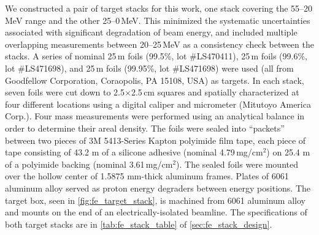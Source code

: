 We constructed a pair of target stacks 
for this work,
one stack covering the 55--20\,MeV range and the other  25--0\,MeV.
This minimized the systematic uncertainties associated with significant degradation of beam energy, and
included multiple overlapping measurements between 20--25\,MeV as a consistency check between the stacks.
A series of nominal 25\,\mmicro m  foils (99.5\%, lot \#LS470411), 25\,\mmicro m  foils (99.6\%, lot \#LS471698), and 25\,\mmicro m  foils (99.95\%, lot \#LS471698) were used (all from Goodfellow Corporation, Coraopolis, PA 15108, USA) as targets.
In each stack, seven foils 
were cut down to 2.5$\times$2.5\,cm squares and spatially characterized 
at four different locations using a digital caliper and micrometer (Mitutoyo America Corp.).
Four mass measurements were performed using an analytical balance 
in order to determine their areal density. 
The foils were  sealed into \enquote{packets} between two pieces of  3M 5413-Series Kapton polyimide film tape,  
each piece of tape 
consisting of 43.2 \mmicro m of a silicone adhesive (nominal 4.79\,mg/cm$^2$) on 25.4 \mmicro m of a polyimide backing (nominal 3.61\,mg/cm$^2$).
The sealed foils were mounted over the hollow center of  1.5875 mm-thick aluminum frames.
Plates of 6061 aluminum alloy  served as proton energy degraders  between energy positions.
The target box, seen in \autoref{fig:fe_target_stack}, is machined from 6061 aluminum alloy and mounts on the end of an electrically-isolated beamline.
The specifications of both target stacks 
are in \autoref{tab:fe_stack_table} of 
\ref{sec:fe_stack_design}.




